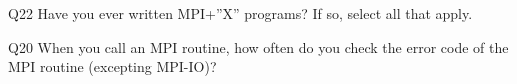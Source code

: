 \begin{description}%
\item{Q22} Have you ever written MPI+”X” programs? If so, select all that apply.%
\item{Q20} When you call an MPI routine, how often do you check the error code of the MPI routine  (excepting MPI-IO)?%
\end{description}%
